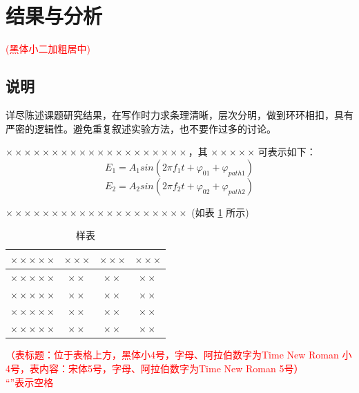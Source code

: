 \documentclass[a4paper]{article}
\newcommand{\song}{\CJKfamily{song}}
\newcommand{\kai}{\CJKfamily{kai}}
\newcommand{\wuhao}{\fontsize{10.5pt}{18pt}\selectfont}
\newcommand{\sectionbreak}{\clearpage} %
\theoremstyle{definition}
\theoremstyle{plain}
\theoremstyle{remark}
\newcommand{\reftab}[1]{表 \ref{#1}}
\newcommand{\hongzifuzhu}[1]{\textcolor{red}{\kai \wuhao(#1)}}
\begin{document}
\sectionbreak

\section{结果与分析}

\hspace{12em}\hongzifuzhu{黑体小二加粗居中}

\subsection{说明}
详尽陈述课题研究结果，在写作时力求条理清晰，层次分明，做到环环相扣，具有严密的逻辑性。避免重复叙述实验方法，也不要作过多的讨论。

$ \times\times\times\times\times\times\times\times\times\times\times\times\times\times\times\times\times\times\times\times $，其 $ \times\times\times\times\times$ 可表示如下：
\begin{equation}
	E_{1}=A_{1}sin\!\left(2\pi f_{1}t+\varphi_{01}+\varphi_{path1} \right)
\end{equation}
\begin{equation}
	E_{2}=A_{2}sin\!\left(2\pi f_{2}t+\varphi_{02}+\varphi_{path2} \right)
\end{equation}

$ \times\times\times\times\times\times\times\times\times\times\times\times\times\times\times\times\times\times\times\times $  (如\reftab{table1} 所示)

\begin{table}[htpb]
	\centering
	\caption{样表}
	\label{table1}
	\song\wuhao\bfseries
	\begin{tabular}{cccc}
		\toprule
		$ \times\times\times\times\times $ & $ \times\times\times $ & $ \times\times\times $ & $ \times\times\times $ \\
		\hline
		$ \times\times\times\times\times $ & $ \times\times $       & $ \times\times $       & $ \times\times $       \\
		$ \times\times\times\times\times $ & $ \times\times $       & $ \times\times $       & $ \times\times $       \\
		$ \times\times\times\times\times $ & $ \times\times $       & $ \times\times $       & $ \times\times $       \\ 	    	\cline{2-4}
		$ \times\times\times\times\times $ & $ \times\times $       & $ \times\times $       & $ \times\times $       \\
		\bottomrule
	\end{tabular}
\end{table}
\textcolor{red}{（表标题：位于表格上方，黑体小4号，字母、阿拉伯数字为Time New Roman 小4号，表内容：宋体5号，字母、阿拉伯数字为Time New Roman 5号）\\ ``\fbox{\phantom{a}}''表示空格}
\end{document}

